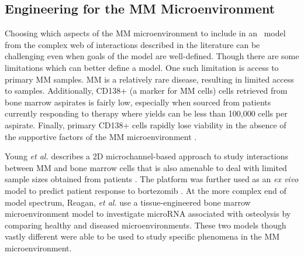\subsection{Engineering for the MM Microenvironment}
Choosing which aspects of the MM microenvironment to include in an \invitro\ model from the complex web of interactions described in the literature can be challenging even when goals of the model are well-defined. Though there are some limitations which can better define a model. One such limitation is access to primary MM samples. MM is a relatively rare disease, resulting in limited access to samples. Additionally, CD138+ (a marker for MM cells) cells retrieved from bone marrow aspirates is fairly low, especially when sourced from patients currently responding to therapy where yields can be less than 100,000 cells per aspirate. Finally, primary CD138+ cells rapidly lose viability in the absence of the supportive factors of the MM microenvironment \cite{Ferrarini2013a, Zhang2014}. 

Young \textit{et al.} describes a 2D microchannel-based approach to study interactions between MM and bone marrow cells that is also amenable to deal with limited sample sizes obtained from patients \cite{Young2012}. The platform was further used as an \textit{ex vivo} model to predict patient response to bortezomib \cite{Pak2015}. At the more complex end of model spectrum, Reagan, \textit{et al.} use a tissue-engineered bone marrow microenvironment model to investigate microRNA associated with osteolysis by comparing healthy and diseased microenvironments. These two models though vastly different were able to be used to study specific phenomena in the MM microenvironment. 
